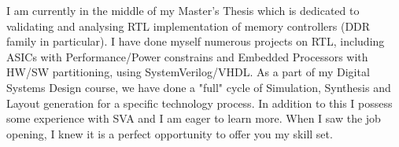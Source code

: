 \documentclass[11pt, a4paper]{awesome-cv}
\begin{document}
\begin{cvletter}
I am currently in the middle of my Master's Thesis which is dedicated to validating and analysing RTL implementation of memory controllers (DDR family in particular). I have done myself numerous projects on RTL, including ASICs with Performance/Power constrains and Embedded Processors with HW/SW partitioning, using SystemVerilog/VHDL. As a part of my Digital Systems Design course, we have done a "full" cycle of Simulation, Synthesis and Layout generation for a specific technology process. In addition to this I possess some experience with SVA and I am eager to learn more. When I saw the job opening, I knew it is a perfect opportunity to offer you my skill set.

\end{cvletter}


\makeletterclosing
\end{document}
